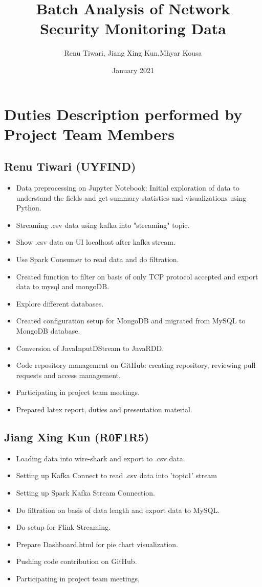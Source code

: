 \documentclass{article}
\title{Batch Analysis of Network Security Monitoring Data}
\author{Renu Tiwari, Jiang Xing Kun,Mhyar Kousa}
\date{January 2021}
\begin{document}
\maketitle

\section{Duties Description performed by Project Team Members}

\subsection{Renu Tiwari (UYFIND)}
\begin{itemize}
    \item Data preprocessing on Jupyter Notebook: Initial exploration of  data to understand the fields and get  summary statistics and visualizations using Python.
    \item Streaming .csv data using kafka into "streaming" topic.
     \item Show .csv data on UI localhost after kafka stream.
    \item Use Spark Consumer to read data and do filtration.
    \item Created function to filter on basis of only TCP protocol accepted and export data to mysql and mongoDB.
    \item Explore different databases.
    \item Created configuration setup for MongoDB and migrated from MySQL to MongoDB database.
    \item Conversion of JavaInputDStream to JavaRDD.
    \item Code repository management on GitHub: creating repository, reviewing pull requests and access management.
    \item Participating in project team meetings.
    \item Prepared latex report, duties and  presentation material.
    \end{itemize}

\subsection{Jiang Xing Kun (R0F1R5)}
\begin{itemize}
   \item Loading data into wire-shark and export to .csv data.
    \item Setting up Kafka Connect to read .csv data into 'topic1' stream
    \item Setting up Spark Kafka Stream Connection.
    \item Do filtration on basis of data length and export data to MySQL.
    \item Do setup for Flink Streaming.
    \item Prepare Dashboard.html for pie chart visualization.
    \item Pushing code contribution on GitHub.
     \item Participating in project team meetings, 
\end{itemize}
\end{document}
